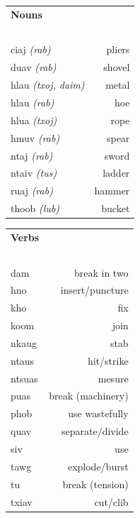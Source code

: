 \documentclass{article}
\begin{document}
\begin{multicols}{2}
[
\section*{}
]

\begin{tabular}{l r}
\textbf{Nouns} \\
~\\
ciaj {\em (rab)} &pliers\\
duav {\em (rab)} &shovel\\
hlau {\em (txoj, daim)} &metal\\
hlau {\em (rab)} &hoe\\
hlua {\em (txoj)} &rope\\
hmuv {\em (rab)} &spear\\
ntaj {\em (rab)} &sword\\
ntaiv {\em (tus)} &ladder\\
ruaj {\em (rab)} &hammer\\
thoob {\em (lub)} &bucket\\
\end{tabular}

\begin{tabular}{l r}
\textbf{Verbs} \\
~\\
dam &break in two\\
hno &insert/puncture\\
kho &fix\\
koom &join\\
nkaug &stab\\
ntaus &hit/strike\\
ntsuas &mesure\\
puas &break (machinery)\\
phob &use wastefully\\
quav &separate/divide\\
siv &use\\
tawg &explode/burst\\
tu &break (tension)\\
txiav &cut/clib\\
\end{tabular}
\end{multicols}

\clearpage
\end{document}
